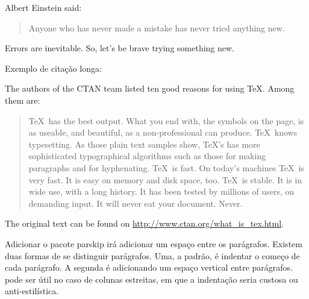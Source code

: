 \documentclass{article}
\begin{document}
Albert Einstein said:

\begin{quote}
    Anyone who has never made a mistake has never tried anything new.
\end{quote}
Errors are inevitable. So, let's be brave trying something new.


Exemplo de citação longa:

The authors of the CTAN team listed ten good reasons
for using \TeX. Among them are:
\begin{quotation}
 \TeX\ has the best output. What you end with,
the symbols on the page, is as useable, and beautiful,
as a non-professional can produce.
 \TeX\ knows typesetting. As those plain text samples
show, \TeX's has more sophisticated typographical algorithms
such as those for making paragraphs and for hyphenating.
 \TeX\ is fast. On today's machines \TeX\ is very fast.
 It is easy on memory and disk space, too.
 \TeX\ is stable. It is in wide use, with a long history.
 It has been tested by millions of users, on demanding input.
 It will never eat your document. Never.
\end{quotation}
The original text can be found on
\url{ http://www.ctan.org/what_is_tex.html}.

Adicionar o pacote parskip irá adicionar um espaço entre os parágrafos.
Existem duas formas de se distinguir parágrafos.
Uma, a padrão, é indentar o começo de cada parágrafo.
A segunda é adicionando um espaço vertical entre parágrafos.
pode ser útil no caso de colunas estreitas, em que a indentação seria custosa ou anti-estilística.
\end{document}
